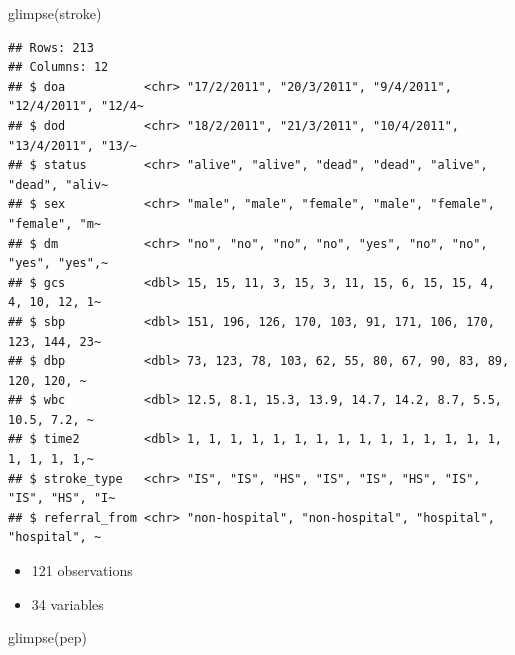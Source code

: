 \documentclass[
  10pt,
]{krantz}
\newenvironment{Shaded}{\begin{snugshade}}{\end{snugshade}}
\newcommand{\FunctionTok}[1]{\textcolor[rgb]{0.00,0.00,0.00}{#1}}
\newcommand{\NormalTok}[1]{#1}
\providecommand{\tightlist}{%
  \setlength{\itemsep}{0pt}\setlength{\parskip}{0pt}}
\begin{document}
\begin{Shaded}
\begin{Highlighting}[]
\FunctionTok{glimpse}\NormalTok{(stroke)}
\end{Highlighting}
\end{Shaded}

\begin{verbatim}
## Rows: 213
## Columns: 12
## $ doa           <chr> "17/2/2011", "20/3/2011", "9/4/2011", "12/4/2011", "12/4~
## $ dod           <chr> "18/2/2011", "21/3/2011", "10/4/2011", "13/4/2011", "13/~
## $ status        <chr> "alive", "alive", "dead", "dead", "alive", "dead", "aliv~
## $ sex           <chr> "male", "male", "female", "male", "female", "female", "m~
## $ dm            <chr> "no", "no", "no", "no", "yes", "no", "no", "yes", "yes",~
## $ gcs           <dbl> 15, 15, 11, 3, 15, 3, 11, 15, 6, 15, 15, 4, 4, 10, 12, 1~
## $ sbp           <dbl> 151, 196, 126, 170, 103, 91, 171, 106, 170, 123, 144, 23~
## $ dbp           <dbl> 73, 123, 78, 103, 62, 55, 80, 67, 90, 83, 89, 120, 120, ~
## $ wbc           <dbl> 12.5, 8.1, 15.3, 13.9, 14.7, 14.2, 8.7, 5.5, 10.5, 7.2, ~
## $ time2         <dbl> 1, 1, 1, 1, 1, 1, 1, 1, 1, 1, 1, 1, 1, 1, 1, 1, 1, 1, 1,~
## $ stroke_type   <chr> "IS", "IS", "HS", "IS", "IS", "HS", "IS", "IS", "HS", "I~
## $ referral_from <chr> "non-hospital", "non-hospital", "hospital", "hospital", ~
\end{verbatim}

\begin{itemize}
\tightlist
\item
  121 observations
\item
  34 variables
\end{itemize}

\begin{Shaded}
\begin{Highlighting}[]
\FunctionTok{glimpse}\NormalTok{(pep)}
\end{Highlighting}
\end{Shaded}
\end{document}
